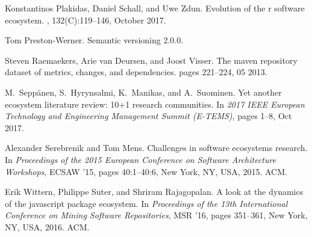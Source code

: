 \documentclass[10pt,conference]{IEEEtran}
\begin{document}
\begin{thebibliography}{10}
  Konstantinos Plakidas, Daniel Schall, and Uwe Zdun.
  \newblock Evolution of the r software ecosystem.
  , 132(C):119--146, October 2017.
  
  Tom Preston-Werner.
  \newblock Semantic versioning 2.0.0.
  
  Steven Raemaekers, Arie van Deursen, and Joost Visser.
  \newblock The maven repository dataset of metrics, changes, and dependencies.
  \newblock pages 221--224, 05 2013.
  
  M.~{Seppänen}, S.~{Hyrynsalmi}, K.~{Manikas}, and A.~{Suominen}.
  \newblock Yet another ecosystem literature review: 10+1 research communities.
  \newblock In {\em 2017 IEEE European Technology and Engineering Management
    Summit (E-TEMS)}, pages 1--8, Oct 2017.
  
  Alexander Serebrenik and Tom Mens.
  \newblock Challenges in software ecosystems research.
  \newblock In {\em Proceedings of the 2015 European Conference on Software
    Architecture Workshops}, ECSAW '15, pages 40:1--40:6, New York, NY, USA,
    2015. ACM.
  
  Erik Wittern, Philippe Suter, and Shriram Rajagopalan.
  \newblock A look at the dynamics of the javascript package ecosystem.
  \newblock In {\em Proceedings of the 13th International Conference on Mining
    Software Repositories}, MSR '16, pages 351--361, New York, NY, USA, 2016.
    ACM.
  

\end{thebibliography}

\vspace{12pt}
\end{document}
